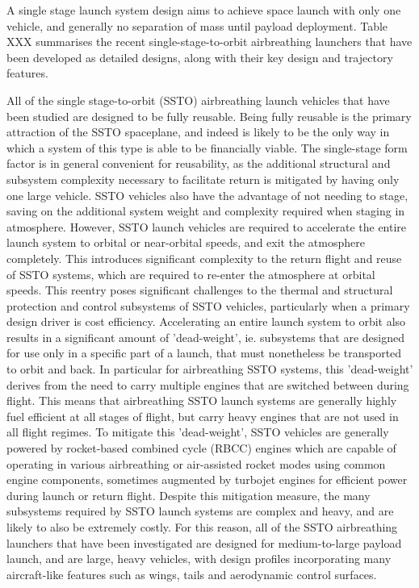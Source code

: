 A single stage launch system design aims to achieve space launch with only one vehicle, and generally no separation of mass until payload deployment. Table XXX summarises the recent single-stage-to-orbit airbreathing launchers that have been developed as detailed designs, along with their key design and trajectory features. 

All of the single stage-to-orbit (SSTO) airbreathing launch vehicles that have been studied are designed to be fully reusable. Being fully reusable is the primary attraction of the SSTO spaceplane, and indeed is likely to be the only way in which a system of this type is able to be financially viable. 
The single-stage form factor is in general convenient for reusability, as the additional structural and subsystem complexity necessary to facilitate return is mitigated by having only one large vehicle. SSTO vehicles also have the advantage of not needing to stage, saving on the additional system weight and complexity required when staging in atmosphere. 
However, SSTO launch vehicles are required to accelerate the entire launch system to orbital or near-orbital speeds, and exit the atmosphere completely. This introduces significant complexity to the return flight and reuse of SSTO systems, which are required to re-enter the atmosphere at orbital speeds\cite{NASP}. This reentry poses significant challenges to the thermal and structural protection and control subsystems of SSTO vehicles, particularly when a primary design driver is cost efficiency.
 Accelerating an entire launch system to orbit also results in a significant amount of 'dead-weight', ie. subsystems that are designed for use only in a specific part of a launch, that must nonetheless be transported to orbit and back. In particular for airbreathing SSTO systems, this 'dead-weight' derives from the need to carry multiple engines that are switched between during flight. This means that airbreathing SSTO launch systems are generally highly fuel efficient at all stages of flight, but carry heavy engines that are not used in all flight regimes. 
To mitigate this 'dead-weight', SSTO vehicles are generally powered by rocket-based combined cycle (RBCC) engines which are capable of operating in various airbreathing or air-assisted rocket modes using common engine components, sometimes augmented by turbojet engines for efficient power during launch or return flight. Despite this mitigation measure, the many subsystems required by SSTO launch systems are complex and heavy, and are likely to also be extremely costly.%
 For this reason, all of the SSTO airbreathing launchers that have been investigated are designed for medium-to-large payload launch, and are large, heavy vehicles, with design profiles incorporating many aircraft-like features such as wings, tails and aerodynamic control surfaces. 

